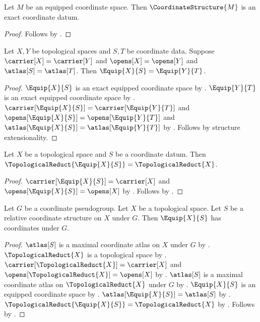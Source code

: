 \begin{theorem}\label{coordinate_structure_is_exact}
    Let $M$ be an equipped coordinate space.
    Then $\CoordinateStructure{M}$ is an exact coordinate datum.
\end{theorem}
\begin{proof}
    Follows by .
\end{proof}

\begin{theorem}\label{equip_same_fields}
    Let $X,Y$ be topological spaces and $S,T$ be coordinate data.
    Suppose $\carrier[X]=\carrier[Y]$ and $\opens[X]=\opens[Y]$ and $\atlas[S]=\atlas[T]$.
    Then $\Equip{X}{S}=\Equip{Y}{T}$.
\end{theorem}
\begin{proof}
    $\Equip{X}{S}$ is an exact equipped coordinate space by .
    $\Equip{Y}{T}$ is an exact equipped coordinate space by .
    $\carrier[\Equip{X}{S}]=\carrier[\Equip{Y}{T}]$ and
        $\opens[\Equip{X}{S}]=\opens[\Equip{Y}{T}]$ and
        $\atlas[\Equip{X}{S}]=\atlas[\Equip{Y}{T}]$ by
        .
    Follows by structure extensionality.
\end{proof}

\begin{theorem}\label{equip_topological_reduct}
    Let $X$ be a topological space and $S$ be a coordinate datum.
    Then $\TopologicalReduct{\Equip{X}{S}}=\TopologicalReduct{X}$.
\end{theorem}
\begin{proof}
    $\carrier[\Equip{X}{S}]=\carrier[X]$ and $\opens[\Equip{X}{S}]=\opens[X]$ by
        .
    Follows by .
\end{proof}

\begin{classification}\label{equip_preserves_coordinates}
    Let $G$ be a coordinate pseudogroup.
    Let $X$ be a topological space.
    Let $S$ be a relative coordinate structure on $X$ under $G$.
    Then $\Equip{X}{S}$ has coordinates under $G$.
\end{classification}
\begin{proof}
    $\atlas[S]$ is a maximal coordinate atlas on $X$ under $G$ by
        .
    $\TopologicalReduct{X}$ is a topological space by
        .
    $\carrier[\TopologicalReduct{X}]=\carrier[X]$ and
        $\opens[\TopologicalReduct{X}]=\opens[X]$ by
        .
    $\atlas[S]$ is a maximal coordinate atlas on $\TopologicalReduct{X}$ under $G$
        by .
    $\Equip{X}{S}$ is an equipped coordinate space by .
    $\atlas[\Equip{X}{S}]=\atlas[S]$ by .
    $\TopologicalReduct{\Equip{X}{S}}=\TopologicalReduct{X}$ by
        .
    Follows by .
\end{proof}


